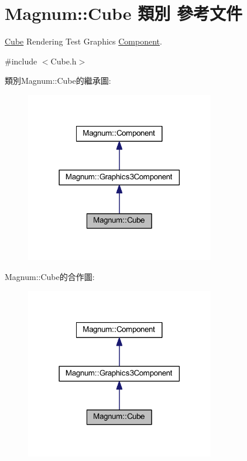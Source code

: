 \hypertarget{class_magnum_1_1_cube}{}\section{Magnum\+:\+:Cube 類別 參考文件}
\label{class_magnum_1_1_cube}


\hyperlink{class_magnum_1_1_cube}{Cube} Rendering Test Graphics \hyperlink{class_magnum_1_1_component}{Component}.  




{\ttfamily \#include $<$Cube.\+h$>$}



類別\+Magnum\+:\+:Cube的繼承圖\+:\nopagebreak
\begin{figure}[H]
\begin{center}
\leavevmode
\includegraphics[width=234pt]{class_magnum_1_1_cube__inherit__graph}
\end{center}
\end{figure}


Magnum\+:\+:Cube的合作圖\+:\nopagebreak
\begin{figure}[H]
\begin{center}
\leavevmode
\includegraphics[width=234pt]{class_magnum_1_1_cube__coll__graph}
\end{center}
\end{figure}
